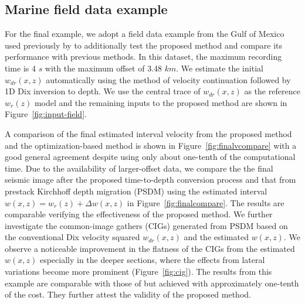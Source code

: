 

\subsection{Marine field data example}

For the final example, we adopt a field data example from the Gulf of Mexico \cite[]{bei} used previously by \cite{siweit2d} to additionally test the proposed method and compare its performance with previous methods. In this dataset, the maximum recording time is 4 $s$ with the maximum offset of 3.48 $km$. We estimate the initial $w_{dr}(x,z)$ automatically using the method of velocity continuation \cite[]{fomelvelcon1} followed by 1D Dix inversion to depth. We use the central trace of $w_{dr}(x,z)$ as the reference $w_r(z)$ model and the remaining inputs to the proposed method are shown in Figure~\ref{fig:input-field}.

A comparison of the final estimated interval velocity from the proposed method and the optimization-based method \cite[]{siweit2d} is shown in Figure~\ref{fig:finalvcompare} with a good general agreement despite using only about one-tenth of the computational time. Due to the availability of larger-offset data, we compare the the final seismic image after the proposed time-to-depth conversion process and that from prestack Kirchhoff depth migration (PSDM) using the estimated interval $w(x,z) = w_r(z) + \Delta w (x,z)$ in Figure~\ref{fig:finalcompare}. The results are comparable verifying the effectiveness of the proposed method. We further investigate the common-image gathers (CIGs) generated from PSDM based on the conventional Dix velocity squared $w_{dr}(x,z)$ and the estimated $w(x,z)$. We observe a noticeable improvement in the flatness of the CIGs from the estimated $w(x,z)$ especially in the deeper sections, where the effects from lateral variations become more prominent (Figure~\ref{fig:cig}). The results from this example are comparable with those of \cite{siweit2d} but achieved with approximately one-tenth of the cost. They further attest the validity of the proposed method.

